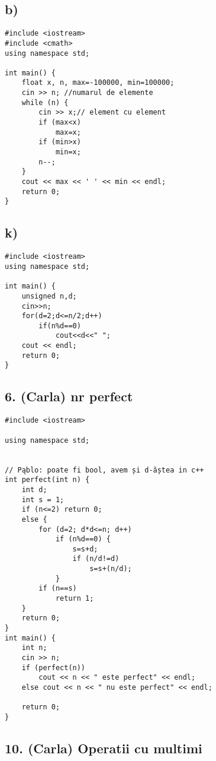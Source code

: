 \documentclass[11pt]{article}
\begin{document}
\subsection*{b)}
\label{sec:org963a05b}
\begin{verbatim}
#include <iostream>
#include <cmath>
using namespace std;

int main() {
    float x, n, max=-100000, min=100000;
    cin >> n; //numarul de elemente
    while (n) {
        cin >> x;// element cu element
        if (max<x)
            max=x;
        if (min>x)
            min=x;
        n--;
    }
    cout << max << ' ' << min << endl;
    return 0;
}
\end{verbatim}
\subsection*{k)}
\label{sec:orgf4b04a6}
\begin{verbatim}
#include <iostream>
using namespace std;

int main() {
    unsigned n,d;
    cin>>n;
    for(d=2;d<=n/2;d++)
        if(n%d==0)
            cout<<d<<" ";
    cout << endl;
    return 0;
}
\end{verbatim}
\subsection*{6. (Carla) nr perfect}
\label{sec:org249cc7e}

\begin{verbatim}
#include <iostream>

using namespace std;


// Pąblo: poate fi bool, avem și d-ăștea in c++ 
int perfect(int n) {
    int d;
    int s = 1;
    if (n<=2) return 0;
    else {
        for (d=2; d*d<=n; d++)
            if (n%d==0) {
                s=s+d;
                if (n/d!=d)
                    s=s+(n/d);
            }
        if (n==s)
            return 1;
    }
    return 0;
}
int main() {
    int n;
    cin >> n;
    if (perfect(n))
        cout << n << " este perfect" << endl;
    else cout << n << " nu este perfect" << endl;

    return 0;
}
\end{verbatim}
\subsection*{10. (Carla) Operatii cu multimi}
\label{sec:orgb110111}
\end{document}
